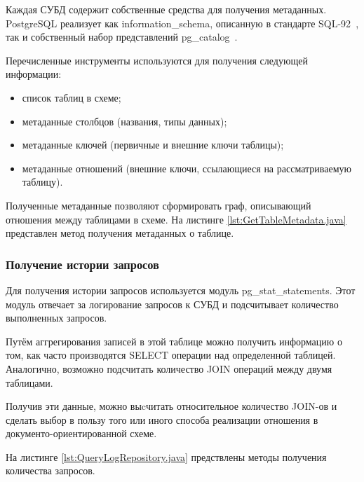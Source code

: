 Каждая СУБД содержит собственные средства для получения метаданных. 
PostgreSQL реализует как \textmd{information\_schema}, описанную в стандарте SQL-92~\cite{sql-92},
так и собственный набор представлений \textmd{pg\_catalog}~\cite{pg-catalog}.

Перечисленные инструменты используются для получения следующей информации:
\begin{itemize}[label=---]
    \item список таблиц в схеме;
    \item метаданные столбцов (названия, типы данных);
    \item метаданные ключей (первичные и внешние ключи таблицы);
    \item метаданные отношений (внешние ключи, ссылающиеся на рассматриваемую таблицу).
\end{itemize}

Полученные метаданные позволяют сформировать граф, описывающий отношения между таблицами в схеме.
На листинге \ref{lst:GetTableMetadata.java} представлен метод получения метаданных о таблице.

\clearpage


\clearpage

\subsubsection{Получение истории запросов}

Для получения истории запросов используется модуль \textmd{pg\_stat\_statements}. 
Этот модуль отвечает за логирование запросов к СУБД и подсчитывает количество выполненных запросов.

Путём аггрегирования записей в этой таблице можно получить информацию о том, 
как часто производятся \textmd{SELECT} операции над определенной таблицей.
Аналогично, возможно подсчитать количество \textmd{JOIN} операций между двумя таблицами.

Получив эти данные, можно выcчитать относительное количество JOIN-ов и 
сделать выбор в пользу того или иного способа реализации отношения в документо-ориентированной схеме.

На листинге \ref{lst:QueryLogRepository.java} предствлены методы получения количества запросов.

\clearpage


